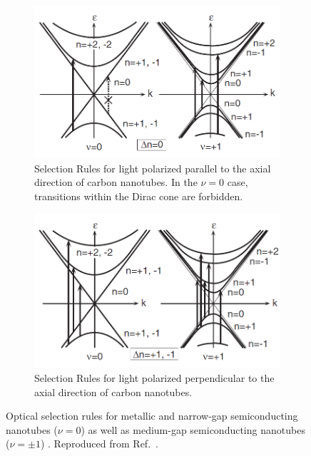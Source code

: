 \begin{figure}[H]
	\centering
	\begin{subfigure}{\textwidth}
		\centering
		\includegraphics[scale=0.65]{images/chapter_optical_props/selection_rules_1.png}
		\caption{Selection Rules for light polarized parallel to the axial direction of carbon nanotubes. In the $\nu=0$ case, transitions within the Dirac cone are forbidden.}
	\end{subfigure}
	\begin{subfigure}{\textwidth}
		\centering
		\includegraphics[scale=0.65]{images/chapter_optical_props/selection_rules_2.png}
		\caption{Selection Rules for light polarized perpendicular to the axial direction of carbon nanotubes.}
	\end{subfigure}
	\caption{Optical selection rules for metallic and narrow-gap semiconducting nanotubes ($\nu = 0 $) as well as medium-gap semiconducting nanotubes ($\nu = \pm 1$) . Reproduced from Ref.\ \cite{ando2005theory}.}
	\label{fig:selection_rules}
\end{figure}

